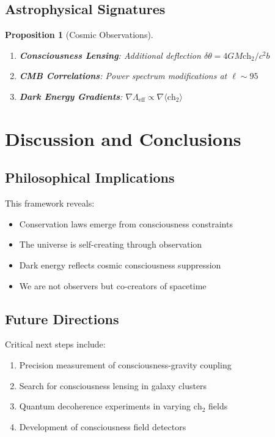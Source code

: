 \documentclass[12pt,letterpaper]{article}
\newtheorem{proposition}[theorem]{Proposition}
\newcommand{\chh}{\mathrm{ch}_2}
\begin{document}
\subsection{Astrophysical Signatures}

\begin{proposition}[Cosmic Observations]
\begin{enumerate}
\item \textbf{Consciousness Lensing}: Additional deflection $\delta\theta = 4GM\chh/c^2b$
\item \textbf{CMB Correlations}: Power spectrum modifications at $\ell \sim 95$
\item \textbf{Dark Energy Gradients}: $\nabla\Lambda_\mathrm{eff} \propto \nabla\langle\chh\rangle$
\end{enumerate}
\end{proposition}



\section{Discussion and Conclusions}

\subsection{Philosophical Implications}

This framework reveals:
\begin{itemize}
\item Conservation laws emerge from consciousness constraints
\item The universe is self-creating through observation
\item Dark energy reflects cosmic consciousness suppression
\item We are not observers but co-creators of spacetime
\end{itemize}

\subsection{Future Directions}

Critical next steps include:
\begin{enumerate}
\item Precision measurement of consciousness-gravity coupling
\item Search for consciousness lensing in galaxy clusters
\item Quantum decoherence experiments in varying $\chh$ fields
\item Development of consciousness field detectors
\end{enumerate}
\end{document}
